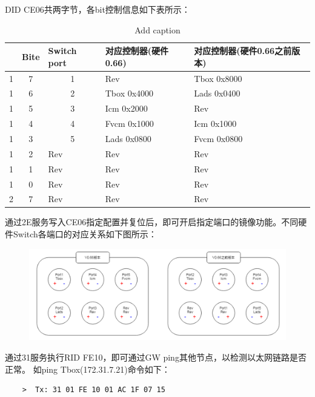 DID CE06共两字节，各bit控制信息如下表所示：

\begin{table}[htbp]
    \centering
    \caption{Add caption}
      \begin{tabular}{ccp{7.165em}p{7.165em}p{8.125em}}
      \toprule
      \rowcolor[rgb]{ .651,  .651,  .651} \multicolumn{1}{p{2.585em}}{\textbf{Byte}} & \multicolumn{1}{p{3.71em}}{\textbf{Bite}} & \textbf{Switch port} & \textbf{对应控制器\newline{}(硬件0.66)} & \textbf{对应控制器\newline{}(硬件0.66之前版本)} \\
      \midrule
      1     & 7     & \multicolumn{1}{c}{1} & Rev   & Tbox    0x8000 \\
      1     & 6     & \multicolumn{1}{c}{2} & Tbox    0x4000 & Lads    0x0400 \\
      1     & 5     & \multicolumn{1}{c}{3} & Icm     0x2000 & Rev \\
      1     & 4     & \multicolumn{1}{c}{4} & Fvcm    0x1000 & Icm     0x1000 \\
      1     & 3     & \multicolumn{1}{c}{5} & Lads    0x0800 & Fvcm    0x0800 \\
      1     & 2     & Rev   & Rev   & Rev \\
      1     & 1     & Rev   & Rev   & Rev \\
      1     & 0     & Rev   & Rev   & Rev \\
      2     & 7     & Rev   & Rev   & Rev \\
      \bottomrule
      \end{tabular}%
    \label{tab:addlabel}%
\end{table}%

通过2E服务写入CE06指定配置并复位后，即可开启指定端口的镜像功能。不同硬件Switch各端口的对应关系如下图所示：

\begin{figure}[ht]
    \centering
    \includegraphics[scale=0.6]{pic/two_version_hardware_mapping.png}
    \caption{}
    \label{fig:two_version_hardware_mapping}
\end{figure}

通过31服务执行RID FE10，即可通过GW ping其他节点，以检测以太网链路是否正常。
如ping Tbox(172.31.7.21)命令如下：

\begin{lstlisting}
    >  Tx: 31 01 FE 10 01 AC 1F 07 15
\end{lstlisting}

